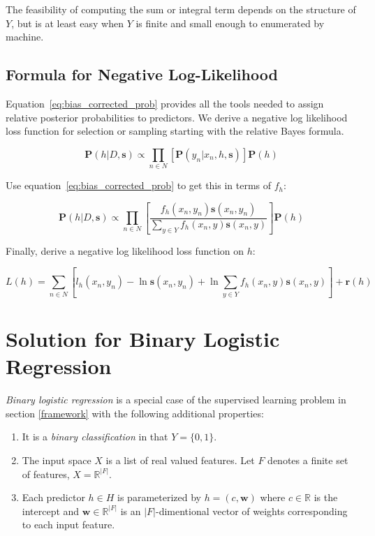 \documentclass[twoside]{article}
\begin{document}
The feasibility of computing the sum or integral term depends on the structure of \(Y\), but is at least easy when \(Y\) is finite and small enough to enumerated by machine.

\subsection{Formula for Negative Log-Likelihood}

Equation~\eqref{eq:bias_corrected_prob} provides all the tools needed to assign relative posterior probabilities to predictors. We derive a negative log likelihood loss function for selection or sampling starting with the relative Bayes formula.

\[\mathbf{P}(h|D,\mathbf{s})\propto\prod_{n \in N} \left[\mathbf{P}(y_n|x_n,h,\mathbf{s})\right]\mathbf{P}(h)\]

Use equation~\eqref{eq:bias_corrected_prob} to get this in terms of \(f_h\):

\[\mathbf{P}(h|D,\mathbf{s})\propto\prod_{n \in N} \left[\frac{f_h(x_n,y_n)\mathbf{s}(x_n,y_n)}{\sum_{y \in Y}f_h(x_n,y)\mathbf{s}(x_n,y)}\right]\mathbf{P}(h)\]

Finally, derive a negative log likelihood loss function on \(h\):

\[L(h)= \sum_{n \in N} \left[l_h(x_n,y_n)-\ln\mathbf{s}(x_n,y_n)+\ln\sum_{y \in Y}f_h(x_n,y)\mathbf{s}(x_n,y) \right] +\mathbf{r}(h)\]

\section{Solution for Binary Logistic Regression}
\label{section:logistic}

\textit{Binary logistic regression} is a special case of the supervised learning problem in section \ref{framework} with the following additional properties:

\begin{enumerate}
	\item It is a \textit{binary classification} in that \(Y = \{0, 1\}\).
	\item The input space \(X\) is a list of real valued features. Let \(F\) denotes a finite set of features, \(X = \mathbb{R} ^{|F|}\).
	\item Each predictor \(h \in H\) is parameterized by \(h = (c, \mathbf{w})\) where \(c \in \mathbb{R}\) is the intercept and \(\mathbf{w} \in \mathbb{R}^{|F|}\) is an \(|F|\)-dimentional vector of weights corresponding to each input feature.
\end{enumerate}
\end{document}
